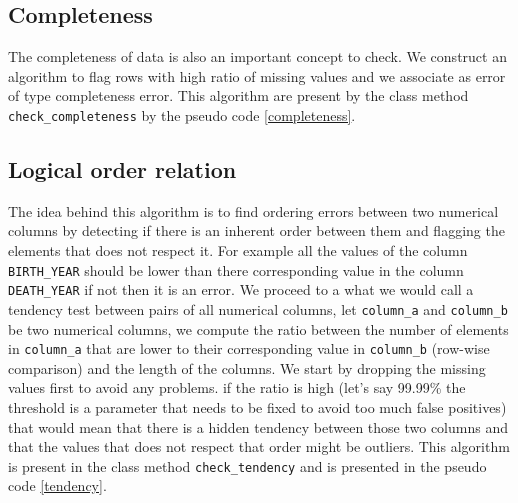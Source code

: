 \documentclass{article}
\begin{document}
\subsection{Completeness} %
\label{sub:Completeness}
The completeness of data is also an important concept to check. We construct an algorithm to flag rows with high ratio of missing values and we associate as error of type completeness error. This algorithm are present by the class method \texttt{check\_completeness} by the pseudo code \ref{completeness}.

\subsection{Logical order relation} %
\label{sub:Logical order relation}
The idea behind this algorithm is to find ordering errors between two numerical columns by detecting if there is an inherent order between them and flagging the elements that does not respect it. For example all the values of the column \texttt{BIRTH\_YEAR} should be lower than there corresponding value in the column \texttt{DEATH\_YEAR} if not then it is an error. We proceed to a what we would call a tendency test between pairs of all numerical columns, let \texttt{column\_a} and \texttt{column\_b} be two numerical columns, we compute the ratio between the number of elements in \texttt{column\_a} that are lower to their corresponding value in \texttt{column\_b} (row-wise comparison) and the length of the columns. We start by dropping the missing values first to avoid any problems. if the ratio is high (let's say 99.99\% the threshold is a parameter that needs to be fixed to avoid too much false positives) that would mean that there is a hidden tendency between those two columns and that the values that does not respect that order might be outliers.
This algorithm is present in the class method \texttt{check\_tendency} and is presented in the pseudo code \ref{tendency}.
\end{document}
